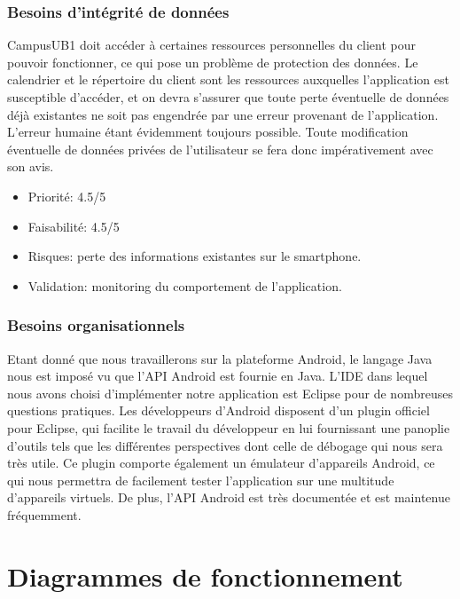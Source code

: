 \documentclass [pdftex,12pt] {report}
\begin{document}
\subsection{Besoins d'intégrité de données}
CampusUB1 doit accéder à certaines ressources personnelles du client pour pouvoir fonctionner, ce qui pose un problème de protection des données. Le calendrier et le répertoire du client sont les ressources auxquelles l'application est susceptible d'accéder, et on devra s'assurer que toute perte éventuelle de données déjà existantes ne soit pas engendrée par une erreur provenant de l'application. L'erreur humaine étant évidemment toujours possible. Toute modification éventuelle de données privées de l'utilisateur se fera donc impérativement avec son avis. \\

\begin{itemize}
\renewcommand{\labelitemi}{$\bullet$}
\item Priorité: 4.5/5
\item Faisabilité: 4.5/5
\item Risques: perte des informations existantes sur le smartphone.
\item Validation: monitoring du comportement de l'application.
\end{itemize} 


\subsection{Besoins organisationnels}
Etant donné que nous travaillerons sur la plateforme Android, le langage Java nous est imposé vu que l'API Android est fournie en Java.
L'IDE dans lequel nous avons choisi d'implémenter notre application est Eclipse pour de nombreuses questions pratiques. Les développeurs d'Android disposent d'un plugin officiel pour Eclipse, qui facilite le travail du développeur en lui fournissant une panoplie d'outils tels que les différentes perspectives dont celle de débogage qui nous sera très utile. Ce plugin comporte également un émulateur d'appareils Android, ce qui nous permettra de facilement tester l'application sur une multitude d'appareils virtuels. De plus, l'API Android est très documentée et est maintenue fréquemment.



\chapter{Diagrammes de fonctionnement}
\end{document}
